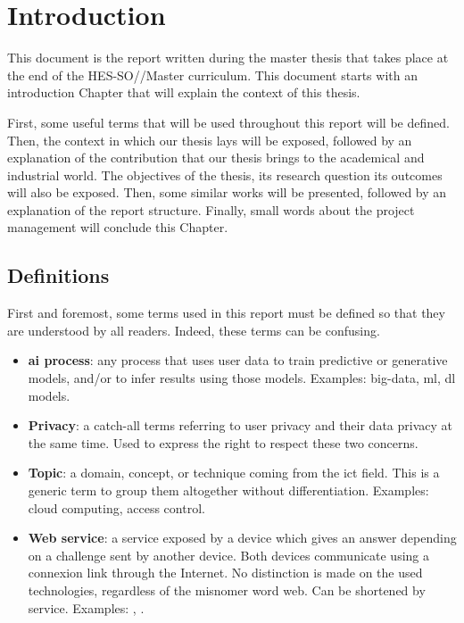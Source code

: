\chapter{Introduction}
\label{chap:introduction}

This document is the report written during the master thesis that takes place at the end of the HES-SO//Master curriculum. This document starts with an introduction Chapter that will explain the context of this thesis.

First, some useful terms that will be used throughout this report will be defined. Then, the context in which our thesis lays will be exposed, followed by an explanation of the contribution that our thesis brings to the academical and industrial world. The objectives of the thesis, its research question its outcomes will also be exposed. Then, some similar works will be presented, followed by an explanation of the report structure. Finally, small words about the project management will conclude this Chapter.

\minitoc

\newpage

\section{Definitions}
\label{sec:introduction_definitions}

First and foremost, some terms used in this report must be defined so that they are understood by all readers. Indeed, these terms can be confusing.

\begin{itemize}
    \item \textbf{\gls{ai} process}: any process that uses user data to train predictive or generative models, and/or to infer results using those models. Examples: \gls{big-data}, \gls{ml}, \gls{dl} models.
    \item \textbf{Privacy}: a catch-all terms referring to user privacy and their data privacy at the same time. Used to express the right to respect these two concerns.
    \item \textbf{Topic}: a domain, concept, or technique coming from the \gls{ict} field. This is a generic term to group them altogether without differentiation. Examples: \gls{cloud} computing, access control.
    \item \textbf{Web service}: a service exposed by a device which gives an answer depending on a challenge sent by another device. Both devices communicate using a connexion link through the Internet. No distinction is made on the used technologies, regardless of the misnomer word web. Can be shortened by service. Examples: , .
\end{itemize}


